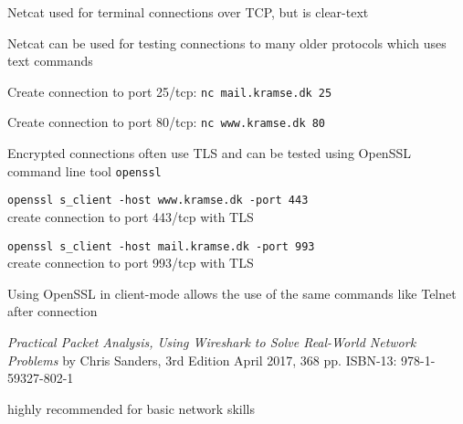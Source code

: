 \documentclass[Screen16to9,17pt]{foils}
\begin{document}

\begin{list1}
\item Netcat used for terminal connections over TCP, but is clear-text
\item Netcat can be used for testing connections to many older protocols which uses text commands
\begin{list2}
\item Create connection to port 25/tcp: \verb+nc mail.kramse.dk 25+
\item Create connection to port 80/tcp: \verb+nc www.kramse.dk 80+
\end{list2}
\item Encrypted connections often use TLS and can be tested using OpenSSL command line tool \verb+openssl+
\begin{list2}
\item \verb+openssl s_client -host www.kramse.dk -port 443+\\
create connection to port 443/tcp with TLS
\item \verb+openssl s_client -host mail.kramse.dk -port 993+\\
create connection to port 993/tcp with TLS
\end{list2}
\item Using OpenSSL in client-mode allows the use of the same commands like Telnet after connection
\end{list1}





\emph{Practical Packet Analysis,
Using Wireshark to Solve Real-World Network Problems}
by Chris Sanders, 3rd Edition
April 2017, 368 pp.
ISBN-13:
978-1-59327-802-1

 highly recommended for basic network skills






\slidenext{}
\end{document}
